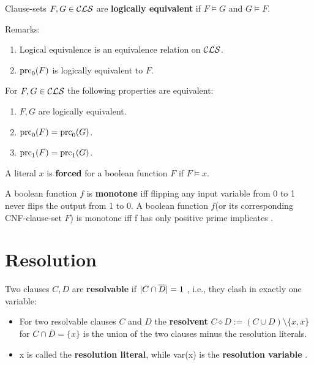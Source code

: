 \documentclass[12pt]{book}
\begin{document}
\begin{defi}\label{def:logequiv}
  Clause-sets $F, G \in \mathcal{CLS}$ are \textbf{logically equivalent} if $F \models G$ and $G \models F$.
\end{defi}
Remarks:
\begin{enumerate}
\item Logical equivalence is an equivalence relation on $\mathcal{CLS}$.
\item $\operatorname{prc}_0(F)$ is logically equivalent to $F$.
\end{enumerate}

\begin{lem}\label{lem:logequiv}
  For $F, G \in \mathcal{CLS}$ the following properties are equivalent:
  \begin{enumerate}
  \item $F, G$ are logically equivalent.
  \item $\operatorname{prc}_0(F) = \operatorname{prc}_0(G)$.
  \item $\operatorname{prc}_1(F) = \operatorname{prc}_1(G)$.
  \end{enumerate}
\end{lem}

\begin{defi}\label{def:forced1}
      A literal $x$ is \textbf{forced} for a boolean function $F$ if $F \models x$.
\end{defi}
\begin{defi}\label{def:imp3}
      A boolean function $f$ is \textbf{monotone} iff flipping any input variable from 0 to 1 never flips the output from 1 to 0.
	  A boolean function $f$(or its corresponding CNF-clause-set $F$) is monotone iff f has only positive prime implicates \cite{h8}.
\end{defi}
\section{Resolution}
\label{sec:Resolution}

\begin{defi}\label{def:Resolution}
 Two clauses $C,D$ are \textbf{resolvable} if $\lvert C \cap \overline D \rvert = 1$ , i.e., they clash in exactly one variable:
\begin{itemize}
 \item For two resolvable clauses $C$ and $D$ the \textbf{resolvent} $C \diamond D := (C \cup D) \setminus \{x, \overline x\} $ for $C \cap \overline D = \{ x \}$ 
 is the union of the two clauses minus the resolution literals.
 \item x is called the \textbf{resolution literal}, while var(x) is the \textbf{resolution variable} \cite{h5}.
 \end{itemize}
 \end{defi}
 
\end{document}
